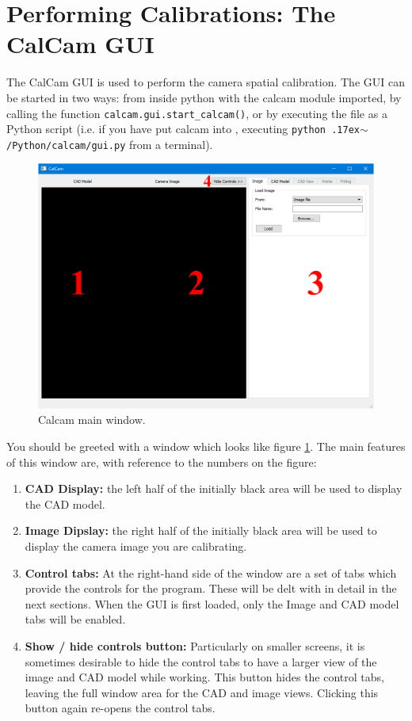\documentclass[12pt]{article}
\newcommand{\code}[1]{\texttt{#1}}
\newcommand{\home}{{\raise.17ex\hbox{$\scriptstyle\mathtt{\sim}$}}}
\begin{document}
\section{Performing Calibrations: The CalCam GUI}

The CalCam GUI is used to perform the camera spatial calibration. The GUI can be started in two ways: from inside python with the calcam module imported, by calling the function \code{calcam.gui.start\_calcam()}, or by executing the file  as a Python script (i.e. if you have put calcam into , executing \code{python \home/Python/calcam/gui.py} from a terminal).

\begin{figure}[ht]
\includegraphics[width=\textwidth]{main_window.PNG}
\caption{\label{fig:main_window}Calcam main window.}
\end{figure}

You should be greeted with a window which looks like figure \ref{fig:main_window}. The main features of this window are, with reference to the numbers on the figure:

\begin{enumerate}
\item{\textbf{CAD Display:} the left half of the initially black area will be used to display the CAD model.}
\item{\textbf{Image Dipslay:} the right half of the initially black area will be used to display the camera image you are calibrating.}
\item{\textbf{Control tabs:} At the right-hand side of the window are a set of tabs which provide the controls for the program. These will be delt with in detail in the next sections. When the GUI is first loaded, only the Image and CAD model tabs will be enabled.}
\item{\textbf{Show / hide controls button:} Particularly on smaller screens, it is sometimes desirable to hide the control tabs to have a larger view of the image and CAD model while working. This button hides the control tabs, leaving the full window area for the CAD and image views. Clicking this button again re-opens the control tabs.}
\end{enumerate}
\end{document}
